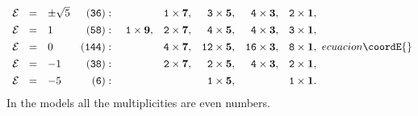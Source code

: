 \documentclass[a4paper,12pt]{article}
\begin{document}
\begin{equation}
{\begin{array}{llrrrrrr}
{\cal E}\ \ =&{\pm\sqrt{5}}& ({\tt 36}):& & {\tt 1} \times
{\bf 7},&{\tt 3} \times {\bf 5},& {\tt 4} \times {\bf 3},&
{\tt 2} \times {\bf 1},\\[4pt]
{\cal E}\ \ =&1 & ({\tt
58}):&\ {\tt 1}
\times {\bf 9},& {\tt 2} \times {\bf 7},& {\tt 4} \times {\bf
5},& {\tt 4} \times {\bf 3},& {\tt 3} \times {\bf 1},\\[4pt]
{\cal E}\ \ =&0& ({\tt 144}):& &  {\tt 4} \times {\bf
7},& {\tt 12} \times {\bf 5},& {\tt 16}
\times {\bf 3},& {\tt 8} \times {\bf 1},\\[4pt]
{\cal E}\ \ =&-1& ({\tt 38}):& &  {\tt 2} \times {\bf
7},& {\tt 2} \times {\bf 5},& {\tt 4}
\times {\bf 3},& {\tt 2} \times {\bf 1},\\[4pt]
{\cal E}\ \ =&{-5}& ({\tt 6}):& && {\tt 1}
\times {\bf 5},&
&{\tt 1} \times {\bf 1}.\nonumber
\end{array}
}{ecuacion}\coordE{}\end{equation}
In the \coordHE{} models all the multiplicities are even numbers.
\end{document}
